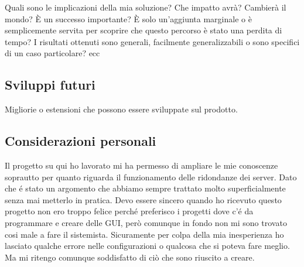 \documentclass[../main.tex]{subfiles}
\begin{document}
Quali sono le implicazioni della mia soluzione? Che impatto avrà?
Cambierà il mondo? È un successo importante? È solo un’aggiunta
marginale o è semplicemente servita per scoprire che questo percorso è
stato una perdita di tempo? I risultati ottenuti sono generali,
facilmente generalizzabili o sono specifici di un caso particolare? ecc

\subsection{Sviluppi futuri}
Migliorie o estensioni che possono essere sviluppate sul prodotto.

\subsection{Considerazioni personali}
Il progetto su qui ho lavorato mi ha permesso di ampliare le mie conoscenze soprautto per quanto riguarda il funzionamento delle ridondanze dei server. Dato che é stato un argomento che abbiamo sempre trattato molto superficialmente senza mai metterlo in pratica. Devo essere sincero quando ho ricevuto questo progetto non ero troppo felice perché preferisco i progetti dove c'é da programmare e creare delle GUI, però comunque in fondo non mi sono trovato cosi male a fare il sistemista. Sicuramente per colpa della mia inesperienza ho lasciato qualche errore nelle configurazioni o qualcosa che si poteva fare meglio. Ma mi ritengo comunque soddisfatto di ciò che sono riuscito a creare.
\end{document}
